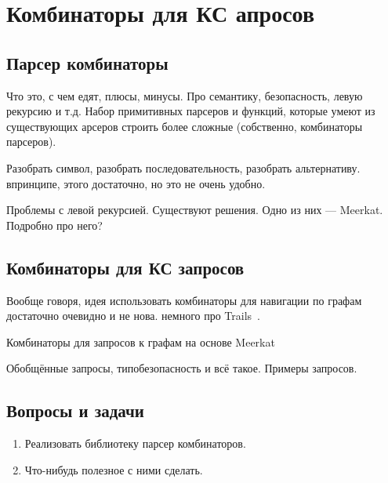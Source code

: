 \section{Комбинаторы для КС апросов}

\subsection{Парсер комбинаторы}

Что это, с чем едят, плюсы, минусы. Про семантику, безопасность, левую рекурсию и т.д.
Набор примитивных парсеров и функций, которые умеют из существующих арсеров строить более сложные (собственно, комбинаторы парсеров).

Разобрать символ, разобрать последовательность, разобрать альтернативу. впринципе, этого достаточно, но это не очень удобно.

Проблемы с левой рекурсией.
Существуют решения. Одно из них --- Meerkat.
Подробно про него?

\subsection{Комбинаторы для КС запросов}

Вообще говоря, идея использовать комбинаторы для навигации по графам достаточно очевидно и не нова.
немного про Trails~\cite{Kroni:2013:PGA:2489837.2489844}.

Комбинаторы для запросов к графам на основе Meerkat~\cite{Verbitskaia:2018:PCC:3241653.3241655}

Обобщённые запросы, типобезопасность и всё такое.
Примеры запросов.

\subsection{Вопросы и задачи}
\begin{enumerate}
  \item Реализовать библиотеку парсер комбинаторов.
  \item Что-нибудь полезное с ними сделать.
\end{enumerate}
